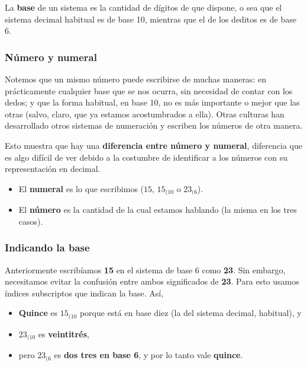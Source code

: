 \documentclass[spanish,a4paper,]{article}
\providecommand{\tightlist}{%
  \setlength{\itemsep}{0pt}\setlength{\parskip}{0pt}}
\begin{document}
La \textbf{base} de un sistema es la cantidad de dígitos de que dispone,
o sea que el sistema decimal habitual es de base 10, mientras que el de
los deditos es de base 6.

\hypertarget{nuxfamero-y-numeral}{%
\subsubsection{Número y numeral}\label{nuxfamero-y-numeral}}

Notemos que un mismo número puede escribirse de muchas maneras: en
prácticamente cualquier base que se nos ocurra, sin necesidad de contar
con los dedos; y que la forma habitual, en base 10, no es más importante
o mejor que las otras (salvo, claro, que ya estamos acostumbrados a
ella). Otras culturas han desarrollado otros sistemas de numeración y
escriben los números de otra manera.

Esto muestra que hay una \textbf{diferencia entre número y numeral},
diferencia que es algo difícil de ver debido a la costumbre de
identificar a los números con su representación en decimal.

\begin{itemize}
\tightlist
\item
  El \textbf{numeral} es lo que escribimos (\(15\),
  \textbf{\(15_{(10}\)} o \textbf{\(23_{(6}\)}).
\item
  El \textbf{número} es la cantidad de la cual estamos hablando (la
  misma en los tres casos).
\end{itemize}

\hypertarget{indicando-la-base}{%
\subsubsection{Indicando la base}\label{indicando-la-base}}

Anteriormente escribíamos \textbf{15} en el sistema de base 6 como
\textbf{23}. Sin embargo, necesitamos evitar la confusión entre ambos
significados de \textbf{23}. Para esto usamos índices subscriptos que
indican la base. Así,

\begin{itemize}
\tightlist
\item
  \textbf{Quince} es \textbf{\(15_{(10}\)} porque está en base diez (la
  del sistema decimal, habitual), y
\item
  \textbf{\(23_{(10}\)} es \textbf{veintitrés},
\item
  pero \textbf{\(23_{(6}\)} es \textbf{dos tres en base 6}, y por lo
  tanto vale \textbf{quince}.
\end{itemize}
\end{document}
